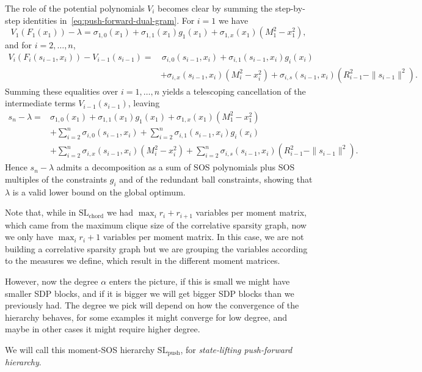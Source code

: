 \documentclass[11pt,a4paper]{article}
\theoremstyle{definition}
\begin{document}
The role of the potential polynomials $V_i$ becomes clear by summing the
step-by-step identities in~\eqref{eq:push-forward-dual-gram}.
For $i=1$ we have
\[
V_1(F_1(x_1)) - \lambda
=
\sigma_{1,0}(x_1) + \sigma_{1,1}(x_1) g_1(x_1)
+ \sigma_{1,x}(x_1)(M_1^2-x_1^2),
\]
and for $i=2,\dots,n$,
\begin{align*}
V_i(F_i(s_{i-1},x_i)) - V_{i-1}(s_{i-1})
=&\,
\sigma_{i,0}(s_{i-1},x_i)
+\sigma_{i,1}(s_{i-1},x_i) g_i(x_i)\\
&+\sigma_{i,x}(s_{i-1},x_i)(M_i^2-x_i^2)
+\sigma_{i,s}(s_{i-1},x_i)(R_{i-1}^2-\|s_{i-1}\|^2).
\end{align*}
Summing these equalities over $i=1,\dots,n$ yields a telescoping cancellation of the
intermediate terms $V_{i-1}(s_{i-1})$, leaving
\begin{align*}
s_n-\lambda
=&  \sigma_{1,0}(x_1)+\sigma_{1,1}(x_1)g_1(x_1)+\sigma_{1,x}(x_1)(M_1^2-x_1^2) \\
&+\sum_{i=2}^n \sigma_{i,0}(s_{i-1},x_i)
+\sum_{i=2}^n \sigma_{i,1}(s_{i-1},x_i)g_i(x_i)\\
&+\sum_{i=2}^n \sigma_{i,x}(s_{i-1},x_i)(M_i^2-x_i^2)
+\sum_{i=2}^n \sigma_{i,s}(s_{i-1},x_i)(R_{i-1}^2-\|s_{i-1}\|^2).
\end{align*}
Hence $s_n-\lambda$ admits a decomposition as a sum of SOS polynomials plus SOS multiples of the constraints $g_i$ and of the redundant ball constraints, showing that $\lambda$ is a valid lower bound on the global optimum.

Note that, while in $\mathrm{SL}_{\mathrm{chord}}$ we had $\max_i r_i+r_{i+1}$ variables per moment matrix, which came from the maximum clique size of the correlative sparsity graph, now we only have $\max_i r_i+1$ variables per moment matrix. In this case, we are not building a correlative sparsity graph but we are grouping the variables according to the measures we define, which result in the different moment matrices.

However, now the degree $\alpha$ enters the picture, if this is small we might have smaller SDP blocks, and if it is bigger we will get bigger SDP blocks than we previously had. The degree we pick will depend on how the convergence of the hierarchy behaves, for some examples it might converge for low degree, and maybe in other cases it might require higher degree.

We will call this moment-SOS hierarchy $\mathrm{SL}_{\mathrm{push}}$, for \emph{state-lifting push-forward hierarchy}.
\end{document}
